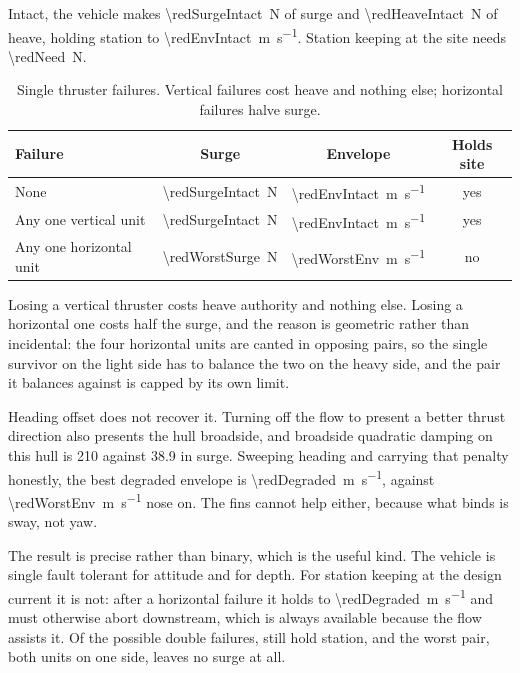 \documentclass[10pt,a4paper]{article}
\begin{document}
Intact, the vehicle makes \SI{\redSurgeIntact}{\newton} of surge and
\SI{\redHeaveIntact}{\newton} of heave, holding station to
\SI{\redEnvIntact}{\metre\per\second}. Station keeping at the site needs
\SI{\redNeed}{\newton}.

\begin{table}[htbp]\centering\small
\caption{Single thruster failures. Vertical failures cost heave and nothing
else; horizontal failures halve surge.}
\begin{tabular}{lccc}
\toprule
\textbf{Failure} & \textbf{Surge} & \textbf{Envelope} & \textbf{Holds site} \\
\midrule
None & \SI{\redSurgeIntact}{\newton} & \SI{\redEnvIntact}{\metre\per\second}
& yes \\
Any one vertical unit & \SI{\redSurgeIntact}{\newton} &
\SI{\redEnvIntact}{\metre\per\second} & yes \\
Any one horizontal unit & \SI{\redWorstSurge}{\newton} &
\SI{\redWorstEnv}{\metre\per\second} & no \\
\bottomrule
\end{tabular}
\end{table}

Losing a vertical thruster costs heave authority and nothing else. Losing a
horizontal one costs half the surge, and the reason is geometric rather than
incidental: the four horizontal units are canted in opposing pairs, so the
single survivor on the light side has to balance the two on the heavy side, and
the pair it balances against is capped by its own limit.

Heading offset does not recover it. Turning off the flow to present a better
thrust direction also presents the hull broadside, and broadside quadratic
damping on this hull is \num{210} against \num{38.9} in surge. Sweeping heading
and carrying that penalty honestly, the best degraded envelope is
\SI{\redDegraded}{\metre\per\second}, against
\SI{\redWorstEnv}{\metre\per\second} nose on. The fins cannot help either, because what
binds is sway, not yaw.

The result is precise rather than binary, which is the useful kind. The
vehicle is single fault tolerant for attitude and for depth. For station
keeping at the design current it is not: after a horizontal failure it holds
to
\SI{\redDegraded}{\metre\per\second} and must otherwise abort downstream, which
is always available because the flow assists it. Of the
\redPairsTotal{} possible double failures, \redPairsOk{} still hold station,
and the worst pair, both units on one side, leaves no surge at all.
\end{document}

